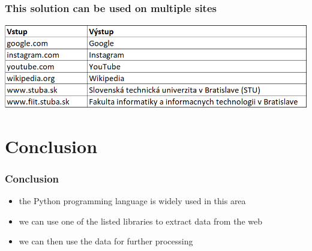 \documentclass{beamer}
\begin{document}
\begin{frame}[fragile=singleslide]\frametitle{This solution can be used on multiple sites}

\includegraphics[scale=0.45]{tabulka.png}

\end{frame}



\section*{Conclusion}

\begin{frame}[fragile=singleslide]\frametitle{Conclusion}
\begin{itemize}
\item the Python programming language is widely used in this area
\item we can use one of the listed libraries to extract data from the web 
\item we can then use the data for further processing 
\end{itemize}
\end{frame}
\end{document}
